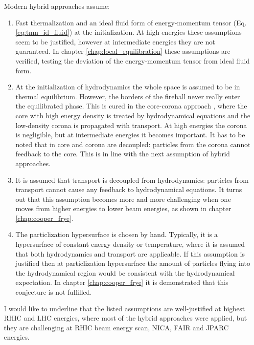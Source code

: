 Modern hybrid approaches assume:

\begin{enumerate}
  \item Fast thermalization and an ideal fluid form of energy-momentum tensor (Eq.
        \ref{eq:tmn_id_fluid}) at the initialization. At high energies these
        assumptions seem to be justified, however at intermediate energies they are
        not guaranteed. In chapter \ref{chap:local_equilibration} these
        assumptions are verified, testing the deviation of the energy-momentum
        tensor from ideal fluid form.
  \item At the initialization of hydrodynamics the whole space is assumed to be in thermal
        equilibrium. However, the borders of the fireball never really enter
        the equilibrated phase. This is cured in the core-corona approach
        \cite{Steinheimer:2011mp}, where the core with high energy density is treated
        by hydrodynamical equations and the low-density corona is propagated with
        transport. At high energies the corona is negligible, but at intermediate
        energies it becomes important. It has to be noted that in
        \cite{Steinheimer:2011mp}
        core and corona are decoupled: particles from the corona cannot feedback to
        the core.
        This is in line with the next assumption of hybrid approaches.
  \item It is assumed that transport is decoupled from hydrodynamics: particles from
        transport cannot cause any feedback to hydrodynamical equations. It turns
        out that this assumption becomes more and more challenging when one moves
        from higher energies to lower beam energies, as shown in chapter \ref{chap:cooper_frye}.
  \item The particlization hypersurface is chosen by hand. Typically, it is a hypersurface
        of constant energy density or temperature, where it is assumed that both
        hydrodynamics and transport are applicable. If this assumption is justified
        then at particlization hypersurface the amount of particles flying into
        the hydrodynamical region would be consistent with the hydrodynamical
        expectation. In chapter \ref{chap:cooper_frye} it is demonstrated that this
        conjecture is not fulfilled.
\end{enumerate}

I would like to underline that the listed assumptions are well-justified at
highest RHIC and LHC energies, where most of the hybrid approaches were applied,
but they are challenging at RHIC beam energy scan, NICA, FAIR and JPARC energies.

